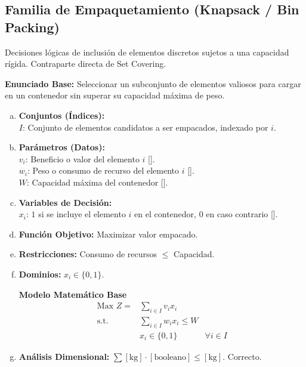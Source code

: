\documentclass{article}
\begin{document}
	\newpage
	
	\subsection{Familia de Empaquetamiento (Knapsack / Bin Packing)}
	Decisiones lógicas de inclusión de elementos discretos sujetos a una capacidad rígida. Contraparte directa de Set Covering.
	
	\textbf{Enunciado Base:} Seleccionar un subconjunto de elementos valiosos para cargar en un contenedor sin superar su capacidad máxima de peso.
	
	\begin{enumerate}[a)]
		\item \textbf{Conjuntos (Índices):}\\
		$I$: Conjunto de elementos candidatos a ser empacados, indexado por $i$.
		
		\item \textbf{Parámetros (Datos):}\\
		$v_i$: Beneficio o valor del elemento $i$ [\text{\$}].\\
		$w_i$: Peso o consumo de recurso del elemento $i$ [].\\
		$W$: Capacidad máxima del contenedor [].
		
		\item \textbf{Variables de Decisión:}\\
		$x_i$: $1$ si se incluye el elemento $i$ en el contenedor, $0$ en caso contrario [].
		\item \textbf{Función Objetivo:} Maximizar valor empacado.
		\item \textbf{Restricciones:} Consumo de recursos $\leq$ Capacidad.
		\item \textbf{Dominios:} $x_i \in \{0, 1\}$.
		
		\begin{center}
			\textbf{Modelo Matemático Base}
			$$\begin{aligned}
				\text{Max } Z = & \sum_{i \in I} v_i x_i \\
				\text{s.t.} \quad & \sum_{i \in I} w_i x_i \leq W \\
				& x_i \in \{0, 1\} & \forall i \in I
			\end{aligned}$$
		\end{center}
		
		\item \textbf{Análisis Dimensional:} $\sum [\text{kg}] \cdot [\text{booleano}] \leq [\text{kg}]$. Correcto.
	\end{enumerate}
	
\end{document}

